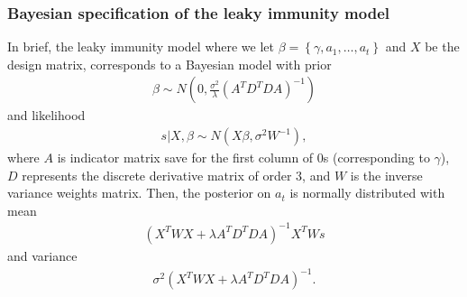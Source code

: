 \documentclass{article}
\begin{document}
\subsubsection{Bayesian specification of the leaky immunity
model}\label{supp:bayesleaky} In brief, the leaky immunity model where we let
$\beta = \left \{  \gamma, a_1,\dots, a_t \right \}$ and $X$ be the design
matrix, corresponds to a Bayesian model with prior 
\begin{align*}
    \beta \sim N \left( 0,  \frac{\sigma^2 }{ \lambda} \left( A^TD^TDA 
    \right)^{-1}  \right)
\end{align*} and likelihood 
\begin{align*}
    s|X,\beta \sim N \left( X\beta, \sigma^2W^{-1} \right),
\end{align*} where $A$ is indicator matrix save for the first column of $0$s 
(corresponding to $\gamma$), $D$ represents the discrete derivative matrix of 
order $3$, and $W$ is the inverse variance weights matrix. Then, the posterior 
on $a_t$ is normally distributed with mean 
\begin{align*}
    \left ( X^TWX + \lambda A^TD^TDA \right )^{-1}X^TWs
\end{align*} 
and variance 
\begin{align*}
    \sigma^2 (X^TWX + \lambda A^TD^TDA)^{-1}.
\end{align*}
\end{document}
